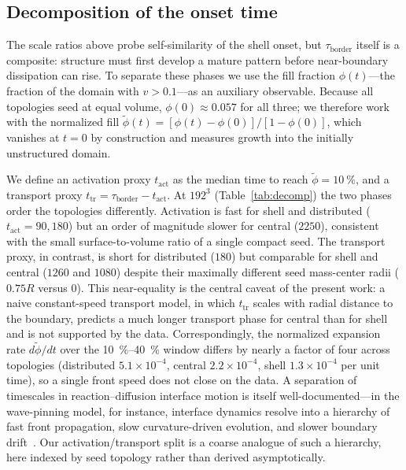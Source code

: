 \documentclass[aps,pre,preprint,superscriptaddress,nofootinbib,floatfix]{revtex4-2}
\newcommand{\tb}{\tau_{\mathrm{border}}}
\begin{document}
\subsection{Decomposition of the onset time}
\label{sec:decomposition}

The scale ratios above probe self-similarity of the shell onset, but $\tb$ itself is a composite: structure must first develop a mature pattern before near-boundary dissipation can rise. To separate these phases we use the fill fraction $\phi(t)$---the fraction of the domain with $v>0.1$---as an auxiliary observable. Because all topologies seed at equal volume, $\phi(0)\approx0.057$ for all three; we therefore work with the normalized fill $\tilde\phi(t) = [\phi(t)-\phi(0)]/[1-\phi(0)]$, which vanishes at $t=0$ by construction and measures growth into the initially unstructured domain.

We define an activation proxy $t_{\mathrm{act}}$ as the median time to reach $\tilde\phi=\SI{10}{\percent}$, and a transport proxy $t_{\mathrm{tr}} = \tb - t_{\mathrm{act}}$. At $192^3$ (Table~\ref{tab:decomp}) the two phases order the topologies differently. Activation is fast for shell and distributed ($t_{\mathrm{act}}=90,180$) but an order of magnitude slower for central ($2250$), consistent with the small surface-to-volume ratio of a single compact seed. The transport proxy, in contrast, is short for distributed ($180$) but comparable for shell and central ($1260$ and $1080$) despite their maximally different seed mass-center radii ($0.75R$ versus $0$). This near-equality is the central caveat of the present work: a naive constant-speed transport model, in which $t_{\mathrm{tr}}$ scales with radial distance to the boundary, predicts a much longer transport phase for central than for shell and is not supported by the data. Correspondingly, the normalized expansion rate $d\tilde\phi/dt$ over the \SIrange{10}{40}{\percent} window differs by nearly a factor of four across topologies (distributed $5.1\times10^{-4}$, central $2.2\times10^{-4}$, shell $1.3\times10^{-4}$ per unit time), so a single front speed does not close on the data. A separation of timescales in reaction--diffusion interface motion is itself well-documented---in the wave-pinning model, for instance, interface dynamics resolve into a hierarchy of fast front propagation, slow curvature-driven evolution, and slower boundary drift~\cite{kobayashi2026}. Our activation/transport split is a coarse analogue of such a hierarchy, here indexed by seed topology rather than derived asymptotically.
\end{document}
